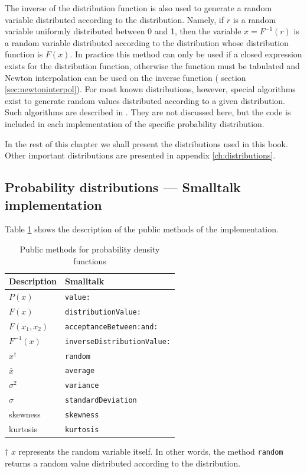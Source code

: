The inverse of the distribution function is also used to generate
a random variable distributed according to the distribution.
Namely, if $r$ is a random variable uniformly distributed between
0 and 1, then the variable $x=F^{-1}\left(r\right)$ is a random
variable distributed according to the distribution whose
distribution function is $F\left(x\right)$. In practice this
method can only be used if a closed expression exists for the
distribution function, otherwise the function must be tabulated
and Newton interpolation can be used on the inverse function (\cf
section \ref{sec:newtoninterpol}). For most known distributions,
however, special algorithms exist to generate random values
distributed according to a given distribution. Such algorithms are
described in \cite{LawKel}. They are not discussed here, but the
code is included in each implementation of the specific
probability distribution.

In the rest of this chapter we shall present the distributions
used in this book. Other important distributions are presented in
appendix \ref{ch:distributions}.

\subsection{Probability distributions --- Smalltalk implementation}
 Table
\ref{tb:distrgenimpl} shows the description of the public methods
of the implementation.
\begin{table}[h]
  \centering
  \caption{Public methods for probability density functions}
  \label{tb:distrgenimpl}
\vspace{1 ex}
\begin{tabular}{|l | l |} \hline
  Description & \hfil Smalltalk \\ \hline
  $P\left(x\right)$ & {\tt value:} \\
  $F\left(x\right)$ & {\tt distributionValue:} \\
  $F\left(x_1,x_2\right)$ & {\tt acceptanceBetween:and:} \\
  $F^{-1}\left(x\right)$ & {\tt inverseDistributionValue:} \\
  $x^{\dag}$ & {\tt random} \\
  \hline
  $\bar{x}$ & {\tt average} \\
  $\sigma^2$ & {\tt variance} \\
  $\sigma$ & {\tt standardDeviation} \\
  skewness & {\tt skewness} \\
  kurtosis & {\tt kurtosis} \\
  \hline
\end{tabular}
$\dag$ $x$ represents the random variable itself. In other words,
the method {\tt random} returns a random value distributed
according to the distribution.
\end{table}

